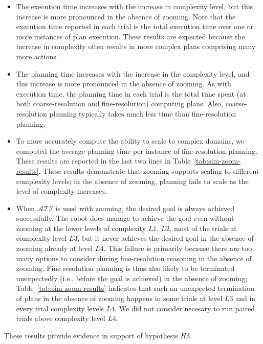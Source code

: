 \documentclass[11pt, oneside]{article}
\begin{document}
\begin{itemize}
\item The execution time increases with the increase in complexity
  level, but this increase is more pronounced in the absence of
  zooming. Note that the execution time reported in each trial is the
  total execution time over one or more instances of plan execution.
  These results are expected because the increase in complexity often
  results in more complex plans comprising many more actions.

\item The planning time increases with the increase in the complexity
  level, and this increase is more pronounced in the absence of
  zooming. As with execution time, the planning time in each trial is
  the total time spent (at both coarse-resolution and fine-resolution)
  computing plans.  Also, coarse-resolution planning typically takes
  much less time than fine-resolution planning.

\item To more accurately compute the ability to scale to complex
  domains, we computed the average planning time per instance of
  fine-resolution planning. These results are reported in the last two
  lines in Table~\ref{tab:sim-zoom-results}. These results demonstrate
  that zooming supports scaling to different complexity levels; in the
  absence of zooming, planning fails to scale as the level of
  complexity increases.

\item When $\mathcal{ATI}$ is used with zooming, the desired goal is
  always achieved successfully. The robot does manage to achieve the
  goal even without zooming at the lower levels of complexity $L1$, $L2$, most of the trials at complexity level $L3$, but it never achieves the desired goal in the absence of zooming already at level $L4$. This failure is primarily because there are too many options to consider during fine-resolution
  reasoning in the absence of zooming. Fine-resolution planning is
  thus also likely to be terminated unexpectedly (i.e., before the
  goal is achieved) in the absence of zooming;
  Table~\ref{tab:sim-zoom-results} indicates that such an unexpected
  termination of plans in the absence of zooming happens in some trials at level $L3$ and in every
  trial complexity levels $L4$. We did not consider necesary to run paired trials above complexity level $L4$.
\end{itemize}
These results provide evidence in support of hypothesis $H3$.


 
 

%
%
 
 
 
\end{document}
